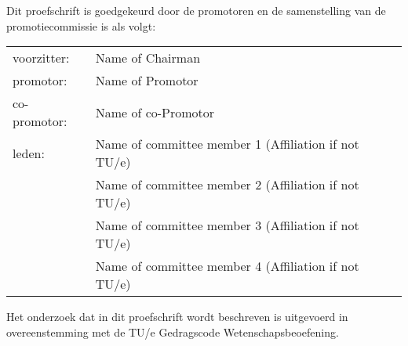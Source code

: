 \newpage
\thispagestyle{empty}

\noindent
Dit proefschrift is goedgekeurd door de promotoren en de samenstelling van de promotiecommissie is als volgt:\\[7mm]

\noindent
\begin{tabular}{@{}l p{9.8cm}}
voorzitter:                 &   Name of Chairman                \\
promotor:                   &   Name of Promotor                \\
co-promotor:                &   Name of co-Promotor             \\
leden:                      &   Name of committee member 1 (Affiliation if not TU/e)   \\
                            &   Name of committee member 2 (Affiliation if not TU/e)   \\
                            &   Name of committee member 3 (Affiliation if not TU/e)   \\
                            &   Name of committee member 4 (Affiliation if not TU/e)   \\
\end{tabular}

\vfill
\noindent
Het onderzoek dat in dit proefschrift wordt beschreven is uitgevoerd in overeenstemming met de TU/e Gedragscode Wetenschapsbeoefening.

